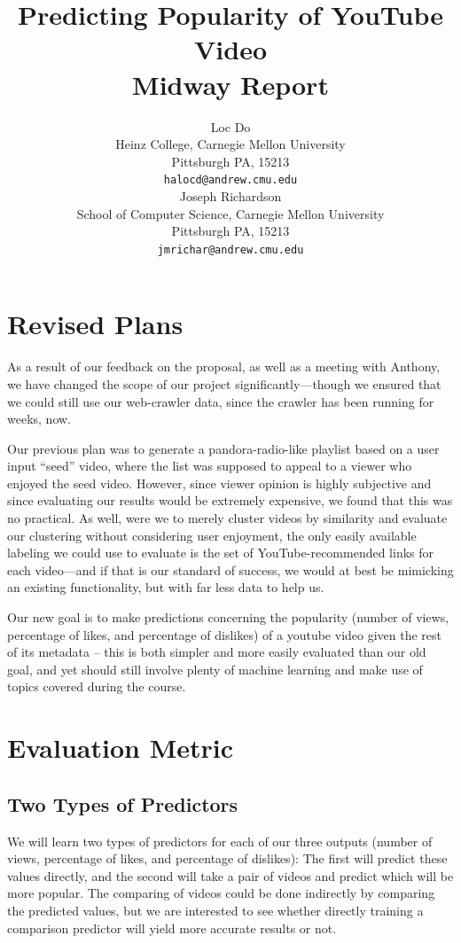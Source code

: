 \documentclass{article} %
\title{Predicting Popularity of YouTube Video\\
Midway Report}
\author{
Loc Do \\
Heinz College,
Carnegie Mellon University \\
Pittsburgh PA, 15213\\
\texttt{halocd@andrew.cmu.edu} \\
\And
Joseph Richardson \\
School of Computer Science,
Carnegie Mellon University \\
Pittsburgh PA, 15213 \\
\texttt{jmrichar@andrew.cmu.edu} \\
}
\begin{document}
\maketitle

\section{Revised Plans}

As a result of our feedback on the proposal, as well as a meeting with Anthony, we have changed the scope of our project significantly—though we ensured that we could still use our web-crawler data, since the crawler has been running for weeks, now.

Our previous plan was to generate a pandora-radio-like playlist based on a user input “seed” video, where the list was supposed to appeal to a viewer who enjoyed the seed video.  However, since viewer opinion is highly subjective and since evaluating our results would be extremely expensive, we found that this was no practical.  As well, were we to merely cluster videos by similarity and evaluate our clustering without considering user enjoyment, the only easily available labeling we could use to evaluate is the set of YouTube-recommended links for each video—and if that is our standard of success, we would at best be mimicking an existing functionality, but with far less data to help us.

Our new goal is to make predictions concerning the popularity (number of views, percentage of likes, and percentage of dislikes) of a youtube video given the rest of its metadata – this is both simpler and more easily evaluated than our old goal, and yet should still involve plenty of machine learning and make use of topics covered during the course.

\section{Evaluation Metric}

\subsection{Two Types of Predictors}

We will learn two types of predictors for each of our three outputs (number of views, percentage of likes, and percentage of dislikes):  The first will predict these values directly, and the second will take a pair of videos and predict which will be more popular.  The comparing of videos could be done indirectly by comparing the predicted values, but we are interested to see whether directly training a comparison predictor will yield more accurate results or not.
\end{document}
